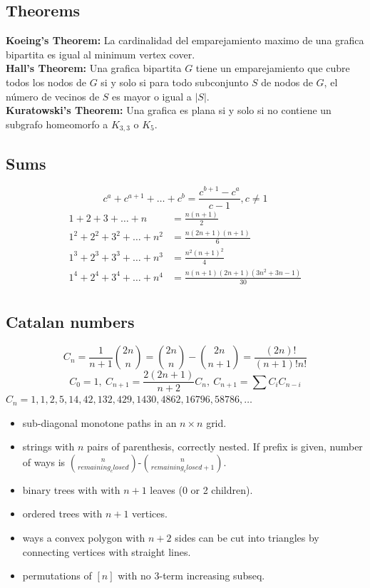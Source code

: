 	\subsection{Theorems}
		\begin{flushleft}
			\textbf{Koeing's Theorem:} La cardinalidad del emparejamiento maximo de una grafica bipartita
			es igual al minimum vertex cover.\\
			\textbf{Hall's Theorem:} Una grafica bipartita $G$ tiene un emparejamiento que cubre todos los nodos
			de $G$ si y solo si para todo subconjunto $S$ de nodos de $G$, el número de vecinos de $S$ es mayor o igual a $|S|$.\\
			\textbf{Kuratowski's Theorem:} Una grafica es plana si y solo si no contiene un subgrafo homeomorfo a $K_{3,3}$ o $K_5$.\\
		\end{flushleft}

\subsection{Sums}
\[ c^a + c^{a+1} + \dots + c^{b} = \frac{c^{b+1} - c^a}{c-1}, c \neq 1 \]
\begin{align*}
	1 + 2 + 3 + \dots + n &= \frac{n(n+1)}{2} \\
	1^2 + 2^2 + 3^2 + \dots + n^2 &= \frac{n(2n+1)(n+1)}{6} \\
	1^3 + 2^3 + 3^3 + \dots + n^3 &= \frac{n^2(n+1)^2}{4} \\
	1^4 + 2^4 + 3^4 + \dots + n^4 &= \frac{n(n+1)(2n+1)(3n^2 + 3n - 1)}{30} \\
\end{align*}

\subsection{Catalan numbers}
\[ C_n=\frac{1}{n+1}\binom{2n}{n}= \binom{2n}{n}-\binom{2n}{n+1} = \frac{(2n)!}{(n+1)!n!} \]
\[ C_0=1,\ C_{n+1} = \frac{2(2n+1)}{n+2}C_n,\ C_{n+1}=\sum C_iC_{n-i} \]
${C_n = 1, 1, 2, 5, 14, 42, 132, 429, 1430, 4862, 16796, 58786, \dots}$
\begin{itemize}
	\item sub-diagonal monotone paths in an $n\times n$ grid.
	\item strings with $n$ pairs of parenthesis, correctly nested. If prefix is given, number of ways is $\binom{n}{remaining_closed}$-$\binom{n}{remaining_closed+1}$.
	\item binary trees with with $n+1$ leaves (0 or 2 children).
	\item ordered trees with $n+1$ vertices.
	\item ways a convex polygon with $n+2$ sides can be cut into triangles by connecting vertices with straight lines.
	\item permutations of $[n]$ with no 3-term increasing subseq.
\end{itemize}
\
